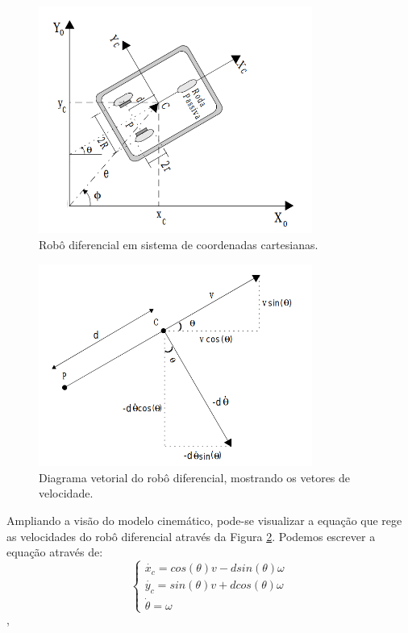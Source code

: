 \begin{figure}[ht]
    \centering
    \includegraphics[width=0.8\textwidth]{capitulos/robo_dif_coordenadas.png}
    \caption{Robô diferencial em sistema de coordenadas cartesianas. \cite{sousa2003controle}}
    \label{fig:robo_coordenada_cart}
\end{figure}
\begin{figure}[ht]
    \centering
    \includegraphics[width=0.8\textwidth]{capitulos/robo_dif_vetorial.png}
    \caption{Diagrama vetorial do robô diferencial, mostrando os vetores de velocidade. \cite{sousa2003controle}}
    \label{fig:robo_coordenada_vet}
\end{figure}
Ampliando a visão do modelo cinemático, pode-se visualizar a equação que rege as velocidades do robô diferencial através da Figura \ref{fig:robo_coordenada_vet}. Podemos escrever a equação através de:
\begin{equation}
  \begin{cases}
     \dot{x_{c}} = cos(\theta)v - dsin(\theta)\omega\\
     \dot{y_{c}} = sin(\theta)v + dcos(\theta)\omega\\
     \dot{\theta} = \omega
  \end{cases}
  \label{eq:1}
\end{equation},
